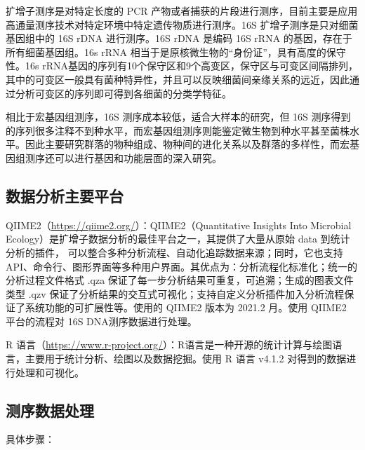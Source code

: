 \documentclass[supercite]{HustGraduPaper}
\begin{document}
扩增子测序是对特定长度的 PCR 产物或者捕获的片段进行测序，目前主要是应用高通量测序技术对特定环境中特定遗传物质进行测序\cite{ranjan2016analysis}。16S 扩增子测序是只对细菌基因组中的 16S rDNA 进行测序\cite{johnson2019evaluation}。16S rDNA 是编码 16S rRNA 的基因，存在于所有细菌基因组。16s rRNA 相当于是原核微生物的“身份证”，具有高度的保守性。16s rRNA基因的序列有10个保守区和9个高变区，保守区与可变区间隔排列，其中的可变区一般具有菌种特异性，并且可以反映细菌间亲缘关系的远近\cite{gray1984evolutionary}，因此通过分析可变区的序列即可得到各细菌的分类学特征。

相比于宏基因组测序，16S 测序成本较低，适合大样本的研究，但 16S 测序得到的序列很多注释不到种水平，而宏基因组测序则能鉴定微生物到种水平甚至菌株水平。因此主要研究群落的物种组成、物种间的进化关系以及群落的多样性，而宏基因组测序还可以进行基因和功能层面的深入研究。

\subsection{数据分析主要平台}

QIIME2\cite{qiime2}（\href{https://qiime2.org/}{https://qiime2.org/}）：QIIME2（Quantitative Insights Into Microbial Ecology）是扩增子数据分析的最佳平台之一，其提供了大量从原始 data 到统计分析的插件， 可以整合多种分析流程、自动化追踪数据来源；同时，它也支持 API、命令行、图形界面等多种用户界面。其优点为：分析流程化标准化；统一的分析过程文件格式 .qza 保证了每一步分析结果可重复，可追溯；生成的图表文件类型 .qzv 保证了分析结果的交互式可视化；支持自定义分析插件加入分析流程保证了系统功能的可扩展性等。使用的 QIIME2 版本为 2021.2 月。使用 QIIME2 平台的流程对 16S DNA测序数据进行处理。

R 语言（\href{https://www.r-project.org/}{https://www.r-project.org/}）：R语言是一种开源的统计计算与绘图语言，主要用于统计分析、绘图以及数据挖掘。使用 R 语言 v4.1.2 对得到的数据进行处理和可视化。

\subsection{测序数据处理}

具体步骤：
\end{document}
